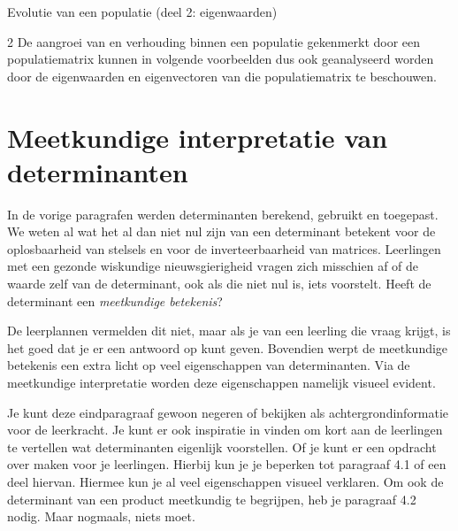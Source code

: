 \begin{lesactiviteit}{Evolutie van een populatie (deel 2: eigenwaarden)}
\begin{vraagenantwoord}

    \end{vraagenantwoord}


    
\end{lesactiviteit}

\begin{multicols}{2}
      De aangroei van en verhouding binnen een populatie gekenmerkt door een populatiematrix kunnen in volgende voorbeelden dus ook geanalyseerd worden door de eigenwaarden en eigenvectoren van die populatiematrix te beschouwen.


 \section{Meetkundige interpretatie van determinanten}

\noindent In de vorige paragrafen werden determinanten berekend, gebruikt en toegepast. We weten al wat het al dan niet nul zijn van een determinant betekent voor de oplosbaarheid van stelsels en voor de inverteerbaarheid van matrices. Leerlingen met een gezonde wiskundige nieuwsgierigheid vragen zich misschien af of de waarde zelf van de determinant, ook als die niet nul is, iets voorstelt. Heeft de determinant een \emph{meetkundige betekenis}? 

De leerplannen vermelden dit niet, maar als je van een leerling die vraag krijgt, is het goed dat je er een antwoord op kunt geven. Bovendien werpt de meetkundige betekenis een extra licht op veel eigenschappen van determinanten. Via de meetkundige interpretatie worden deze eigenschappen namelijk visueel evident.

Je kunt deze eindparagraaf gewoon negeren of bekijken als achtergrondinformatie voor de leerkracht. Je kunt er ook inspiratie in vinden om kort aan de leerlingen te vertellen wat determinanten eigenlijk voorstellen. Of je kunt er een opdracht over maken voor je leerlingen. Hierbij kun je je beperken tot paragraaf 4.1 of een deel hiervan. Hiermee kun je al veel eigenschappen visueel verklaren. Om ook de determinant van een product meetkundig te begrijpen, heb je paragraaf 4.2 nodig. Maar nogmaals, niets moet.
\end{multicols}

